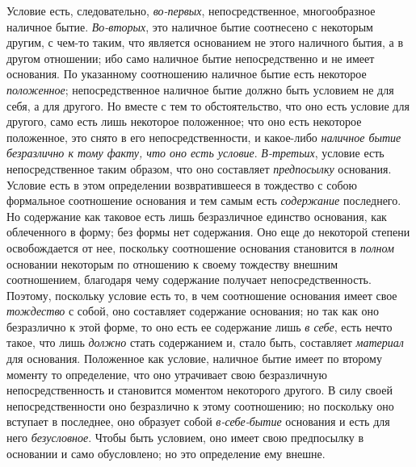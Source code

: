 Условие есть, следовательно, {\em во-первых},
непосредственное, многообразное наличное бытие.
{\em Во-вторых}, это наличное бытие соотнесено с
некоторым другим, с чем-то таким, что является основанием не этого
наличного бытия, а в другом отношении; ибо само наличное бытие
непосредственно и не имеет основания. По указанному соотношению наличное
бытие есть некоторое {\em положенное}; непосредственное
наличное бытие должно быть условием не для себя, а для другого. Но вместе с
тем то обстоятельство, что оно есть условие для другого, само есть лишь
некоторое положенное; что оно есть некоторое положенное, это снято в его
непосредственности, и какое-либо {\em наличное бытие
безразлично к тому факту, что оно есть условие}.
{\em В-третьих}, условие есть непосредственное таким
образом, что оно составляет {\em предпосылку}
основания. Условие есть в этом определении возвратившееся в тождество с
собою формальное соотношение основания и тем самым есть
{\em содержание} последнего. Но содержание как таковое
есть лишь безразличное единство основания, как облеченного в форму; без
формы нет содержания. Оно еще до некоторой степени освобождается от нее,
поскольку соотношение основания становится в
{\em полном} основании некоторым по отношению к своему
тождеству внешним соотношением, благодаря чему содержание получает
непосредственность. Поэтому, поскольку условие есть то, в чем соотношение
основания имеет свое {\em тождество} с собой, оно
составляет содержание основания; но так как оно безразлично к этой форме,
то оно есть ее содержание лишь {\em в себе}, есть нечто
такое, что лишь {\em должно} стать содержанием и, стало
быть, составляет {\em материал} для основания.
Положенное как условие, наличное бытие имеет по второму моменту то
определение, что оно утрачивает свою безразличную непосредственность и
становится моментом некоторого другого. В силу своей непосредственности оно
безразлично к этому соотношению; но поскольку оно вступает в последнее, оно
образует собой {\em в-себе-бытие} основания и есть для
него {\em безусловное}. Чтобы быть условием, оно имеет
свою предпосылку в основании и само обусловлено; но это определение ему
внешне.

